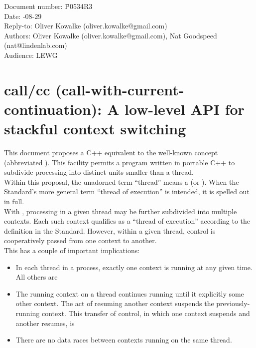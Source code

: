 \documentclass[fontsize=10pt,paper=A4,pagesize,DIV=15]{scrartcl}
\begin{document}
\small
\begin{tabbing}
    Document number: \= P0534R3\\
    Date:            -08-29\\
    Reply-to:        \> Oliver Kowalke (oliver.kowalke@gmail.com)\\
    Authors:         \> Oliver Kowalke (oliver.kowalke@gmail.com), Nat Goodspeed (nat@lindenlab.com)\\
    Audience:        \> LEWG\\
\end{tabbing}

\section*{call/cc (call-with-current-continuation): A low-level API for stackful context switching}


\tableofcontents


This document proposes a C++ equivalent to the well-known concept
 (abbreviated ). This
facility permits a program written in portable C++ to subdivide processing into
distinct  units smaller than a thread.\\

Within this proposal, the unadorned term ``thread'' means a 
(or ).
When the Standard's more general term ``thread of execution'' is intended, it
is spelled out in full.\\

With \cc, processing in a given thread may be further subdivided into multiple
contexts. Each such context qualifies as a ``thread of execution'' according
to the definition in the Standard. However, within a given thread, control is
cooperatively passed from one context to another.\\

This has a couple of important implications:

\begin{itemize}
\item In each thread in a process, exactly one context is running at any given
  time. All others are 
\item The running context on a thread continues running until it explicitly
   some other context. The act of resuming another context
  suspends the previously-running context. This transfer of control, in which
  one context suspends and another resumes, is 
\item There are no data races between contexts running on the same thread.
\end{itemize}
\end{document}

